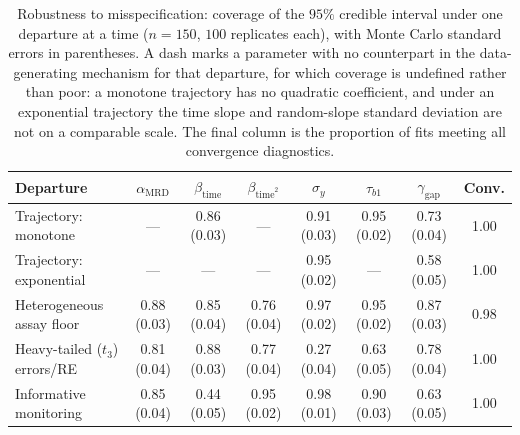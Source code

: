 \begin{table}[!htbp]
\centering
\caption{Robustness to misspecification: coverage of the $95\%$ credible interval under one departure at a time ($n=150$, $100$ replicates each), with Monte Carlo standard errors in parentheses. A dash marks a parameter with no counterpart in the data-generating mechanism for that departure, for which coverage is undefined rather than poor: a monotone trajectory has no quadratic coefficient, and under an exponential trajectory the time slope and random-slope standard deviation are not on a comparable scale. The final column is the proportion of fits meeting all convergence diagnostics.}
\label{tab:sim-misspec}
\small
\begin{tabular}{lcccccc c}
\toprule
Departure & $\alpha_{\mathrm{MRD}}$ & $\beta_{\mathrm{time}}$ & $\beta_{\mathrm{time}^2}$ & $\sigma_y$ & $\tau_{b1}$ & $\gamma_{\mathrm{gap}}$ & Conv.\\
\midrule
Trajectory: monotone & --- & 0.86 (0.03) & --- & 0.91 (0.03) & 0.95 (0.02) & 0.73 (0.04) & 1.00\\
Trajectory: exponential & --- & --- & --- & 0.95 (0.02) & --- & 0.58 (0.05) & 1.00\\
Heterogeneous assay floor & 0.88 (0.03) & 0.85 (0.04) & 0.76 (0.04) & 0.97 (0.02) & 0.95 (0.02) & 0.87 (0.03) & 0.98\\
Heavy-tailed ($t_3$) errors/RE & 0.81 (0.04) & 0.88 (0.03) & 0.77 (0.04) & 0.27 (0.04) & 0.63 (0.05) & 0.78 (0.04) & 1.00\\
Informative monitoring & 0.85 (0.04) & 0.44 (0.05) & 0.95 (0.02) & 0.98 (0.01) & 0.90 (0.03) & 0.63 (0.05) & 1.00\\
\bottomrule
\end{tabular}
\end{table}

